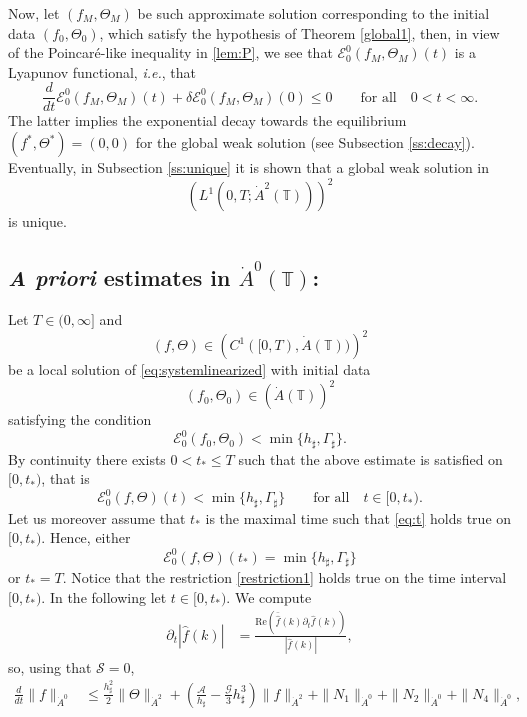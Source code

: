 \documentclass[reqno,11pt]{amsart}
\newcommand{\TT}{{\mathbb T}}
\newcommand{\pat}{\partial_t}
\newcommand{\bh}{h_\sharp}
\newcommand{\bG}{\Gamma_\sharp}
\begin{document}
{Now, let $(f_M,\Theta_M)$ be such approximate solution corresponding to the initial data $(f_0,\Theta_0)$, which satisfy the hypothesis of Theorem \ref{global1}, then, in view of the Poincar\'e-like inequality in \eqref{lem:P}, we see that
$\mathscr{E}^0_0(f_M,\Theta_M)(t)$ is a Lyapunov functional, \emph{i.e.}, that
$$
\frac{d}{dt}\mathscr{E}^0_0(f_M,\Theta_M)(t)+\delta \mathscr{E}^0_0(f_M,\Theta_M)(0)\leq 0 \qquad \mbox{for all}\quad 0<t<\infty.
$$
The latter implies the exponential decay towards the equilibrium $(f^*,\Theta^*)=(0,0)$ for the global weak solution (see Subsection \ref{ss:decay}). Eventually, in Subsection \ref{ss:unique} it is shown that a global weak solution in 
$$
\left(L^1(0,T;\dot A^2(\TT))\right)^2
$$ is unique.


\medskip

\subsection{\emph{A priori} estimates in $\dot A^0(\TT)$:} 
\label{ss:e}
Let $T\in (0,\infty]$ and 
$$
(f,\Theta)\in \left( C^1([0,T), \dot A(\TT))\right)^2
$$ 
be a local solution of \eqref{eq:systemlinearized} with initial data 
$$
(f_0,\Theta_0)\in \left(\dot A(\TT)\right)^2
$$ 
satisfying the condition
\[
	\mathcal{E}_0^0(f_0,\Theta_0)<\min\{\bh,\bG\}.
\]
By continuity there exists $0<t_*\leq T$ such that the above estimate is satisfied  on $[0,t_*)$, that is
\begin{equation}\label{eq:t}
		\mathcal{E}_0^0(f,\Theta)(t)<\min\{\bh,\bG\}\qquad\mbox{for all}\quad t\in [0,t_*).
\end{equation}
Let us moreover assume that $t_*$ is the maximal time such that \eqref{eq:t} holds true on $[0,t_*)$. Hence, either
\begin{equation}\label{eq:O1}
\mathcal{E}_0^0(f,\Theta)(t_*)=\min\{\bh,\bG\}
\end{equation}
or $t_*=T$.
Notice that the restriction \eqref{restriction1} holds true on the time interval $[0,t_*)$. In the following let $t\in [0,t_*)$.
We compute
\begin{align*}
\pat|\hat{f}(k)| &=\frac{\text{Re}\left(\bar{\hat{f}}(k)\pat\hat{f}(k)\right)}{|\hat{f}(k)|},
\end{align*}
so, using that $\mathcal{S}=0$,
\begin{align}
\frac{d}{dt}\|f\|_{\dot A^0}&\leq\frac{\bh^2}{2}\|\Theta\|_{\dot{A}^2} +\left(\frac{\mathcal{A}}{\bh}-\frac{\mathcal{G}}{3}\bh^3\right)\| f\|_{\dot{A}^2}+\|N_1\|_{\dot A^0}+\|N_2\|_{\dot A^0}+\|N_4\|_{\dot A^0}\label{eq:1},\\

\end{align}}
\end{document}
